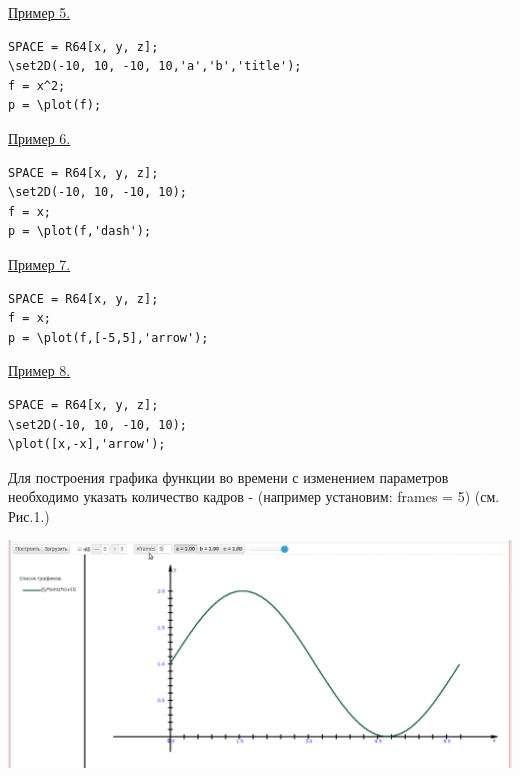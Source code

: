 % 

\underline{Пример 5. }
\vspace*{-2mm}
\begin{verbatim}
SPACE = R64[x, y, z];
\set2D(-10, 10, -10, 10,'a','b','title');
f = x^2; 
p = \plot(f);
\end{verbatim}
\vspace*{-2mm}

\underline{Пример 6. }
\vspace*{-2mm}
\begin{verbatim}
SPACE = R64[x, y, z];
\set2D(-10, 10, -10, 10);
f = x; 
p = \plot(f,'dash');
\end{verbatim}
\vspace*{-2mm}

\underline{Пример 7. }
\vspace*{-2mm}
\begin{verbatim}
SPACE = R64[x, y, z]; 
f = x; 
p = \plot(f,[-5,5],'arrow');
\end{verbatim}
\vspace*{-2mm}

\underline{Пример 8. }
\vspace*{-2mm}
\begin{verbatim}
SPACE = R64[x, y, z]; 
\set2D(-10, 10, -10, 10);
\plot([x,-x],'arrow');
\end{verbatim}
\vspace*{-2mm}

Для построения графика функции во времени с изменением параметров необходимо указать количество кадров - (например установим: frames = 5) (см. Рис.1.)

\includegraphics[scale=0.35]{pictures/2_9}

